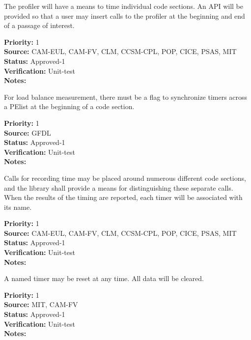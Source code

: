 

The profiler will have a means to time individual code sections.  An API will be 
provided so that a user may insert calls to the profiler at the beginning and
end of a passage of interest.

\begin{reqlist}
{\bf Priority:} 1 \\
{\bf Source:} CAM-EUL, CAM-FV, CLM, CCSM-CPL, POP, CICE, PSAS, MIT \\
{\bf Status:} Approved-1 \\
{\bf Verification:} Unit-test \\
{\bf Notes:} 
\end{reqlist}


For load balance measurement, there must be a flag to synchronize
timers across a PElist at the beginning of a code section.

\begin{reqlist}
{\bf Priority:} 1 \\
{\bf Source:} GFDL \\
{\bf Status:} Approved-1 \\
{\bf Verification:} Unit-test \\
{\bf Notes:} 
\end{reqlist}


Calls for recording time may be placed around numerous different code sections, 
and the library shall provide a means for distinguishing these separate calls.  When
the results of the timing are reported, each timer will be associated with its name.

\begin{reqlist}
{\bf Priority:} 1 \\
{\bf Source:} CAM-EUL, CAM-FV, CLM, CCSM-CPL, POP, CICE, PSAS, MIT \\
{\bf Status:} Approved-1 \\
{\bf Verification:} Unit-test \\
{\bf Notes:} 
\end{reqlist}


A named timer may be reset at any time.  All data will be cleared.

\begin{reqlist}
{\bf Priority:} 1 \\
{\bf Source:} MIT, CAM-FV \\
{\bf Status:} Approved-1 \\
{\bf Verification:} Unit-test \\
{\bf Notes:} 
\end{reqlist}

